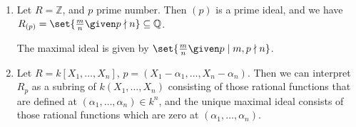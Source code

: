\begin{enumerate}
	\item Let $R = \mathbb{Z}$, and $p$ prime number. Then $(p)$ is a prime ideal,
		and we have $R_{(p)} = \set{\frac{m}{n}\given p\nmid n} \subseteq \mathbb{Q}$.

		The maximal ideal is given by $\set{\frac{m}{n}\given p\mid m, p\nmid n}$.
	\item Let $R = k[X_1, \ldots, X_n]$, $p = (X_1-\alpha_1, \ldots, X_n-\alpha_n)$.
		Then we can interpret $R_p$ as a subring of $k(X_1, \ldots, X_n)$ consisting
		of those rational functions that are defined at
		$(\alpha_1, \ldots, \alpha_n) \in k^n$, and the unique maximal ideal consists
		of those rational functions which are zero at $(\alpha_1, \ldots, \alpha_n)$.
\end{enumerate}
